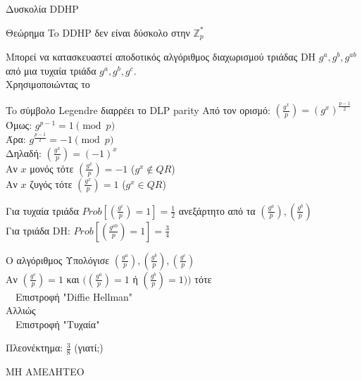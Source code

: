 \documentclass[handout]{beamer}
\begin{document}
\begin{frame}[allowframebreaks]{Δυσκολία DDHP}
\begin{small}
\begin{block}{Θεώρημα}
To DDHP δεν είναι δύσκολο στην $\mathbb{Z}_p^*$
\end{block}
 
Μπορεί να κατασκευαστεί αποδοτικός αλγόριθμος διαχωρισμού τριάδας DH $g^a,g^b,g^{ab}$ από μια τυχαία τριάδα $g^a,g^b,g^c$.\\
 
 Χρησιμοποιώντας το 
 
\begin{block}{To σύμβολο Legendre διαρρέει το DLP parity}
Από τον ορισμό: 
$(\frac{g^{x}}{p}) = (g^{x})^{\frac{p-1}{2}}$ \\
Όμως:
$g^{p-1} = 1 \pmod{p}$ \\
Άρα: 
$g^\frac{p-1}{2} = -1 \pmod{p}$ \\
Δηλαδή:
$(\frac{g^{x}}{p}) = (-1)^x$ \\
Αν $x$ μονός  τότε $(\frac{g^{x}}{p}) = -1$ ($g^x \not\in QR$)\\
Αν $x$ ζυγός  τότε $(\frac{g^{x}}{p}) = 1$  ($g^x \in QR$)
\end{block}
 
Για τυχαία τριάδα $Prob[(\frac{g^{c}}{p}) = 1] = \frac{1}{2}$ ανεξάρτητο από τα $(\frac{g^{a}}{p}),(\frac{g^{b}}{p})$\\
 
Για τριάδα DH: $Prob[(\frac{g^{ab}}{p}) = 1] = \frac{3}{4}$
 
\begin{block}{Ο αλγόριθμος}
Υπολόγισε $(\frac{g^{a}}{p}),(\frac{g^{b}}{p}),(\frac{g^{c}}{p})$ \\
Αν $(\frac{g^{c}}{p}) = 1$ και $((\frac{g^{a}}{p}) =1$  ή $(\frac{g^{b}}{p}) = 1))$ τότε \\
 $\>$$\>$$\>$  Επιστροφή "Diffie Hellman" \\
Αλλιώς \\
  $\>$$\>$$\>$ Επιστροφή "Τυχαία" \\
\end{block}
Πλεονέκτημα: $\frac{3}{8}$ (γιατί;) \\
\end{small}
\alert{ΜΗ ΑΜΕΛΗΤΕΟ}\\

\end{frame}
\end{document}
